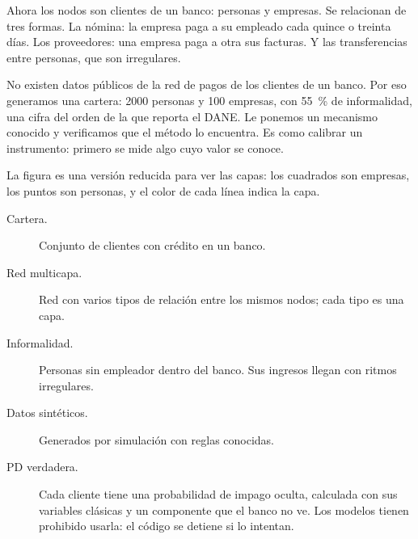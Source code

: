 \begin{decir}
Ahora los nodos son clientes de un banco: personas y empresas. Se relacionan de tres
formas. La nómina: la empresa paga a su empleado cada quince o treinta días. Los
proveedores: una empresa paga a otra sus facturas. Y las transferencias entre personas,
que son irregulares.

No existen datos públicos de la red de pagos de los clientes de un banco. Por eso
generamos una cartera: 2000 personas y 100 empresas, con 55~\% de informalidad, una cifra
del orden de la que reporta el DANE. Le ponemos un mecanismo conocido y verificamos que
el método lo encuentra. Es como calibrar un instrumento: primero se mide algo cuyo valor
se conoce.

La figura es una versión reducida para ver las capas: los cuadrados son empresas, los
puntos son personas, y el color de cada línea indica la capa.
\end{decir}
\begin{terminos}
\begin{description}
\item[Cartera.] Conjunto de clientes con crédito en un banco.
\item[Red multicapa.] Red con varios tipos de relación entre los mismos nodos; cada tipo
es una capa.
\item[Informalidad.] Personas sin empleador dentro del banco. Sus ingresos llegan con
ritmos irregulares.
\item[Datos sintéticos.] Generados por simulación con reglas conocidas.
\item[PD verdadera.] Cada cliente tiene una probabilidad de impago oculta, calculada con
sus variables clásicas y un componente que el banco no ve. Los modelos tienen prohibido
usarla: el código se detiene si lo intentan.
\end{description}
\end{terminos}
\begin{preguntas}
\end{preguntas}

